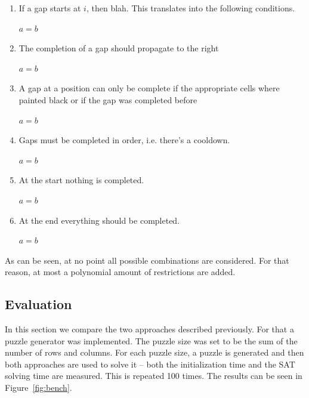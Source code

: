 \documentclass[12pt]{article}
\begin{document}
\begin{enumerate}
  \item If a gap starts at $i$, then blah. This translates into the following conditions.
  \begin{center}
    $a = b$
  \end{center}

  \item The completion of a gap should propagate to the right
  \begin{center}
    $a = b$
  \end{center}

  \item A gap at a position can only be complete if the appropriate cells where painted black or if the gap was completed before
  \begin{center}
    $a = b$
  \end{center}

  \item Gaps must be completed in order, i.e. there's a cooldown.
  \begin{center}
    $a = b$
  \end{center}

  \item At the start nothing is completed.
  \begin{center}
    $a = b$
  \end{center}

  \item At the end everything should be completed.

  \begin{center}
    $a = b$
  \end{center}
\end{enumerate}

As can be seen, at no point all possible combinations are considered. For that reason, at most a polynomial amount of restrictions are added.

\subsection*{Evaluation}

In this section we compare the two approaches described previously.
For that a puzzle generator was implemented. The puzzle size was set to be the sum of the number of rows and columns. For each puzzle size, a puzzle is generated and then both approaches are used to solve it -- both the initialization time and the SAT solving time are measured. This is repeated 100 times. The results can be seen in Figure~\ref{fig:bench}.
\end{document}
